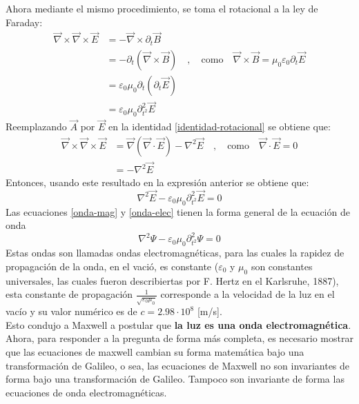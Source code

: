 \documentclass[../main.tex]{subfiles}
\begin{document}
Ahora mediante el mismo procedimiento, se toma el rotacional a la ley de Faraday:
\begin{align*}
     \vec{\nabla} \times \vec{\nabla} \times \vec{E} & = -\vec{\nabla} \times \partial_t\vec{B} \\
     & = - \partial_t(\vec{\nabla} \times \vec{B}) \quad , \quad \text{como} \quad \vec{\nabla} \times \vec{B}  = \mu_0  \varepsilon_0 \partial_t \vec{E} \\
     & = \varepsilon_0\mu_0 \partial_t(\partial_t \vec{E}) \\
     & =  \varepsilon_0\mu_0 \partial^2_{t^2} \vec{E}
\end{align*}
Reemplazando $\vec{A}$ por $\vec{E}$ en la identidad \eqref{identidad-rotacional} se obtiene que:
\begin{align*}
    \vec{\nabla} \times \vec{\nabla} \times \vec{E}& =\vec{\nabla} (\vec{\nabla}\cdot \vec{E}) - \nabla^2\vec{E} \quad , \quad \text{como} \quad \vec{\nabla} \cdot \vec{E}=0 \\
    & = -\nabla^2\vec{E}
\end{align*}
Entonces, usando este resultado en la expresión anterior se obtiene que:
\begin{equation} \label{onda-elec}
        \nabla^2\vec{E}-\varepsilon_0\mu_0 \partial^2_{t^2}\vec{E}=0 
\end{equation}
Las ecuaciones \eqref{onda-mag} y \eqref{onda-elec} tienen la forma general de la ecuación de onda
\begin{equation} \label{ec-onda}
    \nabla^2\Psi - \varepsilon_0 \mu_0 \partial^2_{t^2}\Psi=0
\end{equation}
Estas ondas son llamadas ondas electromagnéticas, para las cuales la rapidez de propagación de la onda, en el vació, es constante ($\varepsilon_0$ y $\mu_0$ son constantes universales, las cuales fueron describiertas por F. Hertz en el Karlsruhe, 1887), esta constante de propagación $\frac{1}{\sqrt{\varepsilon_0\mu_0}}$ corresponde a la velocidad de la luz en el vacío y su valor numérico es de $c=2.98 \cdot 10^{8}$ [m/s].  \\
Esto condujo a Maxwell a postular que \textbf{la luz es una onda electromagnética}. \\
Ahora, para responder a la pregunta de forma más completa, es necesario mostrar que las ecuaciones de maxwell cambian su forma matemática bajo una transformación de Galileo, o sea, las ecuaciones de Maxwell no son invariantes de forma bajo una transformación de Galileo. Tampoco son invariante de forma las ecuaciones de onda electromagnéticas. \\
\end{document}
